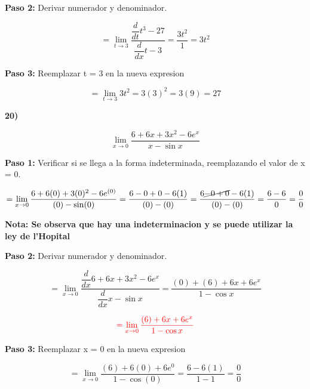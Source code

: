 \documentclass[12pt,a4paper]{article}
\begin{document}
\vspace{0.5cm}



\textbf{Paso 2:}
\vspace{0.2cm}
Derivar numerador y denominador.

\[
= \lim_{t \to 3} \frac{\dfrac{d}{dt} t^3 - 27}{\dfrac{d}{dx} t-3}= \frac{3t^2}{1}= 3t^2
\]

\vspace{0.2cm}



\textbf{Paso 3:}
\vspace{0.2cm}
Reemplazar t = 3 en la nueva expresion

\[
= \lim_{t \to 3} 3t^2= 3(3)^2= 3(9)= 27
\]

\newpage


\textbf{20)}

\[
\lim_{x \to 0} \frac{6+6x+3x^{2}-6e^{x}}{x- \sin x} 
\]


\vspace{0.2cm}

\textbf{Paso 1:}
\vspace{0.2cm}
Verificar si se llega a la forma indeterminada, reemplazando el valor de x = 0.

\[
= \lim_{x \to 0} \frac{6+6(0)+3(0)^{2}-6e^{(0)}}{(0)- \sin (0)}= \frac{6-0+0-6(1)}{(0)-(0)}=\frac{6\cancel{-0+0}-6(1)}{(0)-(0)} =\frac{6-6}{0}=  \frac{0}{0}
\]

\vspace{0.2cm}

\textbf{Nota: Se observa que hay una indeterminacion y se puede utilizar la ley de l'Hopital }

\vspace{0.5cm}

\textbf{Paso 2:}
\vspace{0.2cm}
Derivar numerador y denominador.

\[
= \lim_{x \to 0} \frac{\dfrac{d}{dx} 6+6x+3x^{2}-6e^{x}}{\dfrac{d}{dx} x- \sin x}= \frac{(0)+(6)+6x+6e^x}{1-\cos x}
\]

\[
\textcolor{red}{= \lim_{x \to 0} \frac{(6)+6x+6e^x}{1-\cos x}}
\]

\vspace{0.2cm}



\textbf{Paso 3:}
\vspace{0.2cm}
Reemplazar x = 0 en la nueva expresion

\[
= \lim_{x \to 0} \frac{(6)+6(0)+6e^0}{1-\cos (0)}= \frac{6-6(1)}{1-1}= \frac{0}{0}
\]
\end{document}
